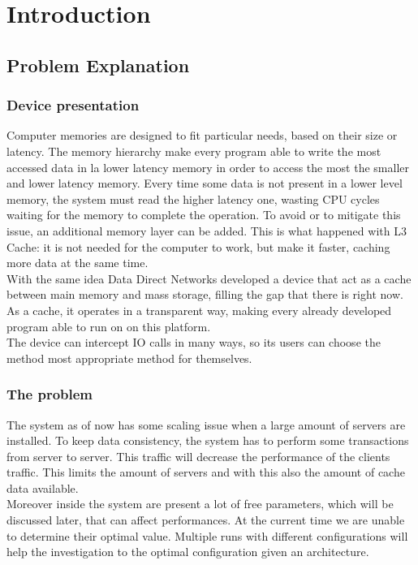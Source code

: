 \chapter{Introduction}

\section{Problem Explanation}
\subsection{Device presentation}
Computer memories are designed to fit particular needs, based on their size or
latency. The memory hierarchy make every program able to write the most accessed
data in la lower latency memory in order to access the most the smaller and
lower latency memory. Every time some data is not present in a lower level
memory, the system must read the higher latency one, wasting CPU cycles waiting
for the memory to complete the operation. To avoid or to mitigate this issue, an
additional memory layer can be added. This is what happened with L3 Cache: it is
not needed for the computer to work, but make it faster, caching more data at
the same time. \\
With the same idea Data Direct Networks developed a device that act as a cache
between main memory and mass storage, filling the gap that there is right now.
\\ As a cache, it operates in a transparent way, making every already developed
program able to run on on this platform. \\ The device can intercept IO calls in
many ways, so its users can choose the method most appropriate method for
themselves.

\subsection{The problem}
The system as of now has some scaling issue when a large amount of servers are
installed. To keep data consistency, the system has to perform some transactions
from server to server. This traffic will decrease the performance of the
clients traffic. This limits the amount of servers and with this also the amount
of cache data available. \\
Moreover inside the system are present a lot of free parameters, which will be
discussed later, that can affect performances. At the current time we are
unable to determine their optimal value. Multiple runs with different
configurations will help the investigation to the optimal configuration given an
architecture.


